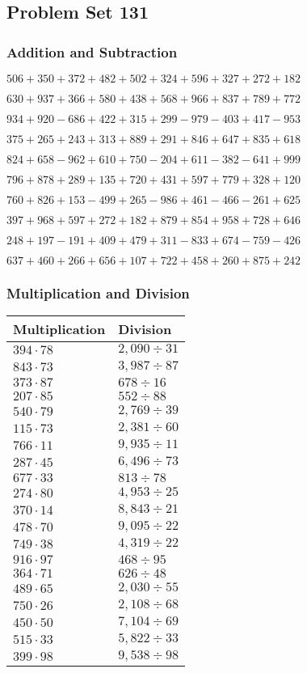 \hypertarget{problem-set-131}{%
\subsection{Problem Set 131}\label{problem-set-131}}

\hypertarget{addition-and-subtraction}{%
\subsubsection{Addition and
Subtraction}\label{addition-and-subtraction}}

\(506 +350 +372 +482 +502 +324 +596 +327 +272 +182\)

\(630 +937 +366 +580 +438 +568 +966 +837 +789 +772\)

\(934 +920 - 686 +422 +315 +299 - 979 - 403 +417 - 953\)

\(375 +265 +243 +313 +889 +291 +846 +647 +835 +618\)

\(824 +658 - 962 +610 +750 - 204 +611 - 382 - 641 +999\)

\(796 +878 +289 +135 +720 +431 +597 +779 +328 +120\)

\(760 +826 +153 - 499 +265 - 986 +461 - 466 - 261 +625\)

\(397 +968 +597 +272 +182 +879 +854 +958 +728 +646\)

\(248 +197 - 191 +409 +479 +311 - 833 +674 - 759 - 426\)

\(637 +460 +266 +656 +107 +722 +458 +260 +875 +242\)

\hypertarget{multiplication-and-division}{%
\subsubsection{Multiplication and
Division}\label{multiplication-and-division}}

\begin{longtable}[]{@{}ll@{}}
\toprule
Multiplication & Division\tabularnewline
\midrule
\endhead
\(394 \cdot 78\) & \(2,090÷31\)\tabularnewline
\(843 \cdot 73\) & \(3,987÷87\)\tabularnewline
\(373 \cdot 87\) & \(678÷16\)\tabularnewline
\(207 \cdot 85\) & \(552÷88\)\tabularnewline
\(540 \cdot 79\) & \(2,769÷39\)\tabularnewline
\(115 \cdot 73\) & \(2,381÷60\)\tabularnewline
\(766 \cdot 11\) & \(9,935÷11\)\tabularnewline
\(287 \cdot 45\) & \(6,496÷73\)\tabularnewline
\(677 \cdot 33\) & \(813÷78\)\tabularnewline
\(274 \cdot 80\) & \(4,953÷25\)\tabularnewline
\(370 \cdot 14\) & \(8,843÷21\)\tabularnewline
\(478 \cdot 70\) & \(9,095÷22\)\tabularnewline
\(749 \cdot 38\) & \(4,319÷22\)\tabularnewline
\(916 \cdot 97\) & \(468÷95\)\tabularnewline
\(364 \cdot 71\) & \(626÷48\)\tabularnewline
\(489 \cdot 65\) & \(2,030÷55\)\tabularnewline
\(750 \cdot 26\) & \(2,108÷68\)\tabularnewline
\(450 \cdot 50\) & \(7,104÷69\)\tabularnewline
\(515 \cdot 33\) & \(5,822÷33\)\tabularnewline
\(399 \cdot 98\) & \(9,538÷98\)\tabularnewline
\bottomrule
\end{longtable}

